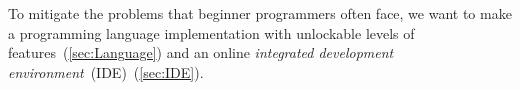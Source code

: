 To mitigate the problems that beginner programmers often face, we want to
make a programming language implementation with unlockable levels of
features~(\autoref{sec:Language}) and an online \emph{integrated development
environment}~(IDE)~(\autoref{sec:IDE}).
